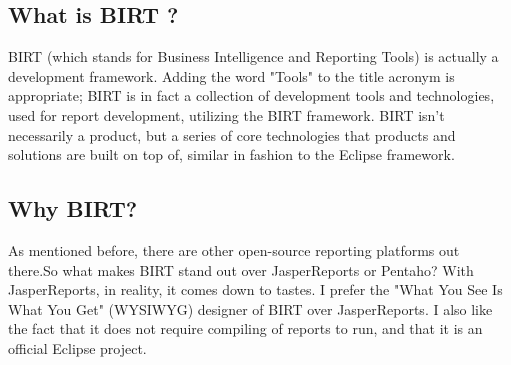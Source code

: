 \subsection{What is BIRT ?}
BIRT (which stands for Business Intelligence and Reporting Tools) is actually a
development framework. Adding the word "Tools" to the title acronym is
appropriate; BIRT is in fact a collection of development tools and technologies,
used for report development, utilizing the BIRT framework. BIRT isn't necessarily
a product, but a series of core technologies that products and solutions are
built on top of, similar in fashion to the Eclipse framework.

\subsection{Why BIRT?}
As mentioned before, there are other open-source reporting platforms out there.So
what makes BIRT stand out over JasperReports or Pentaho? With JasperReports, in
reality, it comes down to tastes. I prefer the "What You See Is What You Get"
(WYSIWYG) designer of BIRT over JasperReports. I also like the fact that it does
not require compiling of reports to run, and that it is an official Eclipse
project.
